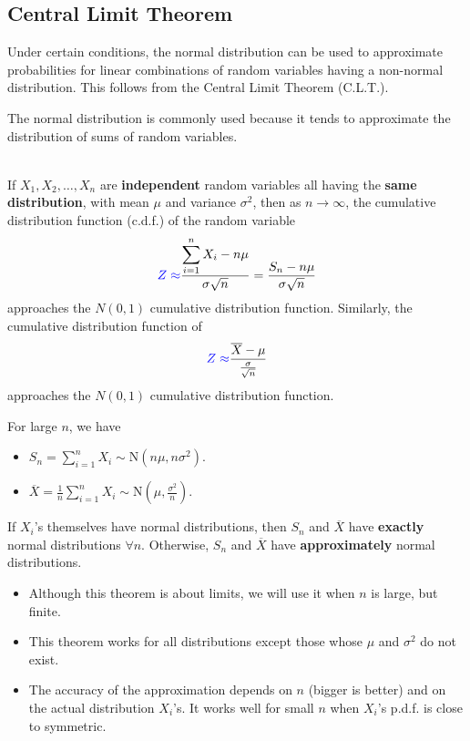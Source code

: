 \subsection{Central Limit Theorem}


Under certain conditions, the normal distribution can be used to approximate probabilities for linear combinations of random variables having a non-normal distribution. This follows from the Central Limit Theorem (C.L.T.). 

The normal distribution is commonly used because it tends to approximate the distribution of sums of random variables.


\begin{theorem}
    \phantom{}  \\
    If $X_1, X_2, \ldots, X_n$ are \textbf{independent} random variables all having the \textbf{same distribution},
    with mean $\mu$ and variance $\sigma^2$, then as $n \to \infty$, the cumulative distribution
    function (c.d.f.) of the random variable
    \[{\color{blue} Z \approx} \frac{\displaystyle \sum_{i=1}^n X_i - n\mu}{\sigma \sqrt{n}} = \frac{S_n - n\mu}{\sigma \sqrt{n}}\]
    approaches the $N(0, 1)$ cumulative distribution function. Similarly, the cumulative distribution
    function of 
    \[{\color{blue} Z \approx} \frac{\overline{X} - \mu}{\frac{\sigma}{\sqrt{n}}}\]
    approaches the $N(0, 1)$ cumulative distribution function.
\end{theorem}

\begin{remark}
    For large $n$, we have
    \begin{itemize}
        \item $S_n = \displaystyle \sum_{i=1}^{n} X_i \sim \text{N}(n\mu, n\sigma^2)$.
        \item $\overline{X} = \frac{1}{n} \displaystyle \sum_{i=1}^{n} X_i \sim \text{N}(\mu, \frac{\sigma^2}{n})$.
    \end{itemize}
    If $X_i$'s themselves have normal distributions, then $S_n$ and $\overline{X}$ have \textbf{exactly} normal distributions $\forall n$. Otherwise, $S_n$ and $\overline{X}$ have \textbf{approximately} normal distributions.
\end{remark}

\pagebreak

\begin{note}
    \phantom{}
    \begin{itemize}
        \item Although this theorem is about limits, we will use it when $n$ is large, but finite.
        \item This theorem works for all distributions except those whose $\mu$ and $\sigma^2$ do not exist.
        \item The accuracy of the approximation depends on $n$ (bigger is better) and on the actual distribution $X_i$'s. It works well for small $n$ when $X_i$'s p.d.f. is close to symmetric.
    \end{itemize}
\end{note}

